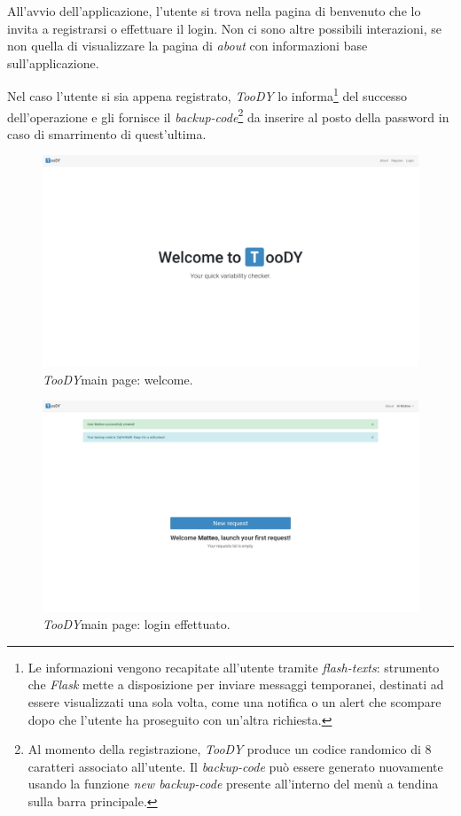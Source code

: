 \documentclass[12pt]{report}
\newcommand{\toody}{\textsl{TooDY}\xspace}
\newcommand{\flask}{\textsl{Flask}\xspace}
\begin{document}
All'avvio dell'applicazione, l'utente si trova nella pagina di benvenuto che lo invita a registrarsi o effettuare il login. Non ci sono altre possibili interazioni, se non quella di visualizzare la pagina di \textit{about} con informazioni base sull'applicazione.

Nel caso l'utente si sia appena registrato, \toody lo informa\footnote{Le informazioni vengono recapitate all'utente tramite \textit{flash-texts}: strumento che \flask mette a disposizione per inviare messaggi temporanei, destinati ad essere visualizzati una sola volta, come una notifica o un alert che scompare dopo che l'utente ha proseguito con un'altra richiesta.} del successo dell'operazione e gli fornisce il \textit{backup-code}\footnote{Al momento della registrazione, \toody produce un codice randomico di 8 caratteri associato all'utente. Il \textit{backup-code} può essere generato nuovamente usando la funzione \textit{new backup-code} presente all'interno del menù a tendina sulla barra principale.} da inserire al posto della password in caso di smarrimento di quest'ultima.

\begin{figure}[H]
\centering
\includegraphics[width=1.0\textwidth]{pagina1-welcome.png}
\caption{\toody \textsf{main page}: welcome.}
\label{fig:pagina1-login}
\end{figure}

\begin{figure}[H]
\centering
\includegraphics[width=1.0\textwidth]{pagina1-login.png}
\caption{\toody \textsf{main page}: login effettuato.}
\label{fig:pagina1-login}
\end{figure}
\end{document}
